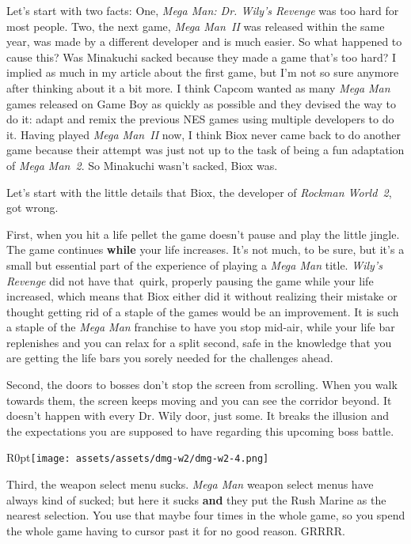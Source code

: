 \documentclass{book}
\begin{document}
Let’s start with two facts: One, \emph{Mega Man: Dr. Wily’s Revenge} was too hard for most people. Two, the next game, \emph{Mega Man~II} was released within the same year, was made by a different developer and is much easier. So what happened to cause this? Was Minakuchi sacked because they made a game that’s too hard? I implied as much in my article about the first game, but I’m not so sure anymore after thinking about it a bit more. I think Capcom wanted as many \emph{Mega Man} games released on Game Boy as quickly as possible and they devised the way to do it: adapt and remix the previous NES games using multiple developers to do it. Having played \emph{Mega Man~II} now, I think Biox never came back to do another game because their attempt was just not up to the task of being a fun adaptation of \emph{Mega Man~2}. So Minakuchi wasn’t sacked, Biox was.\par
Let’s start with the little details that Biox, the developer of \emph{Rockman World~2}, got wrong.\par
First, when you hit a life pellet the game doesn’t pause and play the little jingle. The game continues \textbf{while} your life increases. It’s not much, to be sure, but it’s a small but essential part of the experience of playing a \emph{Mega Man} title. \emph{Wily’s Revenge} did not have that~quirk, properly pausing the game while your life increased, which means that Biox either did it without realizing their mistake or thought getting rid of a staple of the games would be an improvement. It is such a staple of the \emph{Mega Man} franchise to have you stop mid-air, while your life bar replenishes and you can relax for a split second, safe in the knowledge that you are getting the life bars you sorely needed for the challenges ahead.\par
Second, the doors to bosses don’t stop the screen from scrolling. When you walk towards them, the screen keeps moving and you can see the corridor beyond. It doesn’t happen with every Dr. Wily door, just some. It breaks the illusion and the expectations you are supposed to have regarding this upcoming boss battle.\par
\begin{wrapfigure}{R}{0pt}{\texttt{[image: assets/assets/dmg-w2/dmg-w2-4.png]}}\end{wrapfigure}
Third, the weapon select menu sucks. \emph{Mega Man} weapon select menus have always kind of sucked; but here it sucks \textbf{and} they put the Rush Marine as the nearest selection. You use that maybe four times in the whole game, so you spend the whole game having to cursor past it for no good reason. GRRRR.\par
\end{document}
